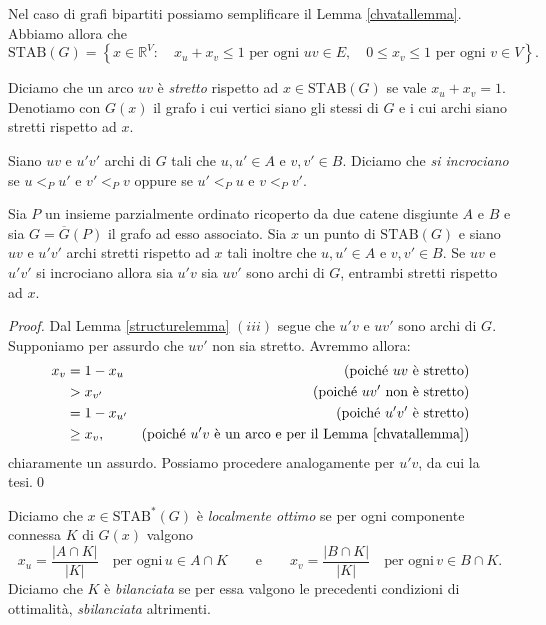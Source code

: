 Nel caso di grafi bipartiti possiamo semplificare il Lemma \ref{chvatallemma}. Abbiamo allora che
\[\text{STAB}(G)=\left\{x\in \mathbb{R}^V:\quad x_u + x_v\le 1 \text{ per ogni } uv\in E,\quad 0\le x_v\le 1 \text{ per ogni } v\in V\right\}.\]
\begin{definition}
	Diciamo che un arco \(uv\) è \emph{stretto} rispetto ad \(x\in\text{STAB}(G)\) se vale \(x_u+x_v=1\). Denotiamo con \(G(x)\) il grafo i cui vertici siano gli stessi di \(G\) e i cui archi siano stretti rispetto ad \(x\). 
\end{definition}
\begin{definition}
	Siano \(uv\) e \(u'v'\) archi di \(G\) tali che \(u,u'\in A\) e \(v,v'\in B\). Diciamo che \emph{si incrociano} se \(u<_{P}u'\) e \(v'<_{P}v\) oppure se \(u'<_{P}u\) e \(v<_{P}v'\). 
\end{definition}
\begin{lemma}
	\label{crossinglemma} Sia \(P\) un insieme parzialmente ordinato ricoperto da due catene disgiunte \(A\) e \(B\) e sia \(G=\overline{G}(P)\) il grafo ad esso associato. Sia \(x\) un punto di \(\text{STAB}(G)\) e siano \(uv\) e \(u'v'\) archi stretti rispetto ad \(x\) tali inoltre che \(u,u'\in A\) e \(v,v'\in B\). Se \(uv\) e \(u'v'\) si incrociano allora sia \(u'v\) sia \(uv'\) sono archi di \(G\), entrambi stretti rispetto ad \(x\). 
\end{lemma}
\begin{proof}
	Dal Lemma \ref{structurelemma} \((iii)\) segue che \(u'v\) e \(uv'\) sono archi di \(G\). Supponiamo per assurdo che \(uv'\) non sia stretto. Avremmo allora: 
	\begin{align}
		x_v &= 1-x_u &\text{(poich\'e } uv \text{ \`e stretto)}\nonumber \\
		&> x_{v'} &\text{(poich\'e } uv' \text{ non \`e stretto)}\nonumber \\
		&= 1-x_{u'} &\text{(poich\'e } u'v' \text{ \`e stretto)}\nonumber \\
		&\ge x_{v}, &\text{(poich\'e } u'v \text{ \`e un arco e per il Lemma \ref{chvatallemma})}\nonumber 
	\end{align}
	chiaramente un assurdo. Possiamo procedere analogamente per \(u'v\), da cui la tesi.\qed 
\end{proof}
\begin{definition}
	Diciamo che \(x\in\text{STAB}^{*}(G)\) è \emph{localmente ottimo} se per ogni componente connessa \(K\) di \(G(x)\) valgono
	\[x_u=\frac{|A\cap K|}{|K|}\quad\text{per ogni}\,u\in A\cap K\qquad\text{e}\qquad x_v=\frac{|B\cap K|}{|K|}\quad\text{per ogni}\,v\in B\cap K.\]
	Diciamo che \(K\) è \emph{bilanciata} se per essa valgono le precedenti condizioni di ottimalità, \emph{sbilanciata} altrimenti. 
\end{definition}

